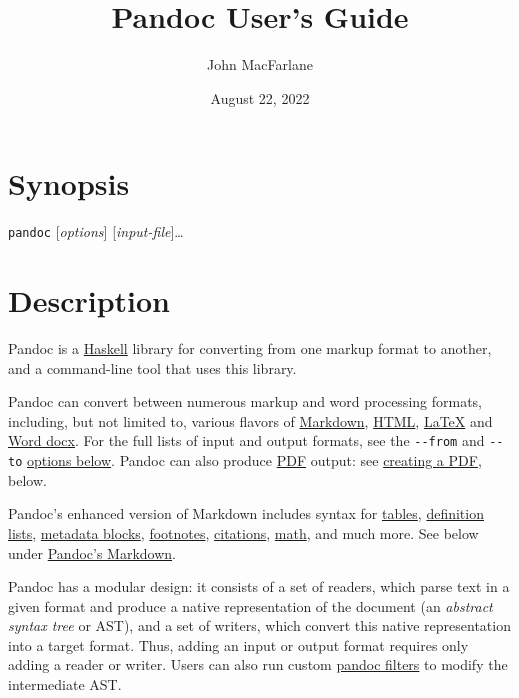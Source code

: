 \documentclass[
]{article}
\title{Pandoc User's Guide}
\author{John MacFarlane}
\date{August 22, 2022}
\begin{document}
\maketitle

\hypertarget{synopsis}{%
\section{Synopsis}\label{synopsis}}

\texttt{pandoc} {[}\emph{options}{]} {[}\emph{input-file}{]}\ldots{}

\hypertarget{description}{%
\section{Description}\label{description}}

Pandoc is a \href{https://www.haskell.org}{Haskell} library for
converting from one markup format to another, and a command-line tool
that uses this library.

Pandoc can convert between numerous markup and word processing formats,
including, but not limited to, various flavors of
\href{https://daringfireball.net/projects/markdown/}{Markdown},
\href{https://www.w3.org/html/}{HTML},
\href{https://www.latex-project.org/}{LaTeX} and
\href{https://en.wikipedia.org/wiki/Office_Open_XML}{Word docx}. For the
full lists of input and output formats, see the \texttt{-\/-from} and
\texttt{-\/-to} \protect\hyperlink{general-options-1}{options below}.
Pandoc can also produce \href{https://www.adobe.com/pdf/}{PDF} output:
see \protect\hyperlink{creating-a-pdf}{creating a PDF}, below.

Pandoc's enhanced version of Markdown includes syntax for
\protect\hyperlink{tables}{tables},
\protect\hyperlink{definition-lists}{definition lists},
\protect\hyperlink{metadata-blocks}{metadata blocks},
\protect\hyperlink{footnotes}{footnotes},
\protect\hyperlink{citations}{citations},
\protect\hyperlink{math}{math}, and much more. See below under
\protect\hyperlink{pandocs-markdown}{Pandoc's Markdown}.

Pandoc has a modular design: it consists of a set of readers, which
parse text in a given format and produce a native representation of the
document (an \emph{abstract syntax tree} or AST), and a set of writers,
which convert this native representation into a target format. Thus,
adding an input or output format requires only adding a reader or
writer. Users can also run custom
\href{https://pandoc.org/filters.html}{pandoc filters} to modify the
intermediate AST.
\end{document}
